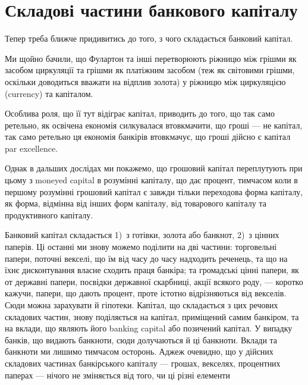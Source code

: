 


\section{Складові частини банкового капіталу}

Тепер треба ближче придивитись до того, з чого складається банковий
капітал.

Ми щойно бачили, що Фулартон та інші перетворюють ріжницю між грішми
як засобом циркуляції та грішми як платіжним засобом (теж як світовими
грішми, оскільки доводиться вважати на відплив золота) у ріжницю між циркуляцією
(currency) та капіталом.

Особлива роля, що її тут відіграє капітал, приводить до того, що так само
ретельно, як освічена економія силкувалася втовкмачити, що гроші — не капітал,
так само ретельно ця економія банкірів втовкмачує, що гроші дійсно є капітал
par excellence.

Однак в дальших дослідах ми покажемо, що грошовий капітал переплутують
при цьому з moneyed capital в розумінні капіталу, що дає процент,
тимчасом коли в першому розумінні грошовий капітал є завжди тільки переходова
форма капіталу, як форма, відмінна від інших форм капіталу, від
товарового капіталу та продуктивного капіталу.

Банковий капітал складається 1)~з готівки, золота або банкнот, 2)~з
цінних паперів. Ці останні ми знову можемо поділити на дві частини: торговельні
папери, поточні векселі, що їм від часу до часу надходить реченець, та
що на їхнє дисконтування власне сходить праця банкіра; та громадські
цінні папери, як от державні папери, посвідки державної скарбниці, акції
всякого роду, — коротко кажучи, папери, що дають процент, проте істотно відрізняються
від векселів. Сюди можна зарахувати й гіпотеки. Капітал, що складається
з цих речових складових частин, знову поділяється на капітал, приміщений
самим банкіром, та на вклади, що являють його banking capital або
позичений капітал. У випадку банків, що видають банкноти, сюди долучаються й ці
банкноти. Вклади та банкноти ми лишимо тимчасом осторонь. Аджеж очевидно,
що у дійсних складових частинах банкірського капіталу — грошах, векселях,
процентних паперах — нічого не зміняється від того, чи ці різні елементи
\parbreak{}  %
